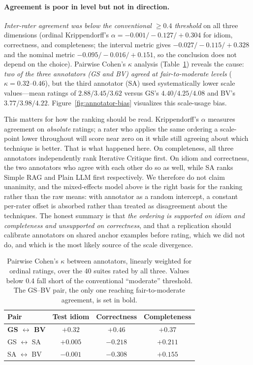 \documentclass[smallextended]{svjour3}
\begin{document}
\paragraph{Agreement is poor in level but not in direction.}
\emph{Inter-rater agreement was below the conventional $\geq 0.4$
threshold} on all three dimensions (ordinal Krippendorff's
$\alpha = -0.001 / -0.127 / +0.304$ for idiom, correctness, and
completeness; the interval metric gives $-0.027 / -0.115 / +0.328$
and the nominal metric $-0.095 / -0.016 / +0.151$, so the conclusion
does not depend on the choice). Pairwise Cohen's $\kappa$ analysis
(Table~\ref{tab:humaneval-kappa}) reveals the cause: \emph{two of
the three annotators (GS and BV) agreed at fair-to-moderate levels}
($\kappa = 0.32$--$0.46$), but the third annotator (SA) used
systematically lower scale values—mean ratings of
$2.88 / 3.45 / 3.62$ versus GS's $4.40 / 4.25 / 4.08$ and BV's
$3.77 / 3.98 / 4.22$. Figure~\ref{fig:annotator-bias} visualizes
this scale-usage bias.

This matters for how the ranking should be read. Krippendorff's
$\alpha$ measures agreement on \emph{absolute} ratings; a rater who
applies the same ordering a scale-point lower throughout will score
near zero on it while still agreeing about which technique is better.
That is what happened here. On completeness, all three annotators
independently rank Iterative Critique first. On idiom and
correctness, the two annotators who agree with each other do so as
well, while SA ranks Simple RAG and Plain LLM first respectively. We
therefore do not claim unanimity, and the mixed-effects model above
is the right basis for the ranking rather than the raw means: with
annotator as a random intercept, a constant per-rater offset is
absorbed rather than treated as disagreement about the techniques. The
honest summary is that \emph{the ordering is supported on idiom and
completeness and unsupported on correctness}, and that a replication
should calibrate annotators on shared anchor examples before
rating, which we did not do, and which is the most likely source of
the scale divergence.

\begin{table}[t]
\centering
\caption{Pairwise Cohen's $\kappa$ between annotators, linearly weighted
for ordinal ratings, over the 40 suites rated by all three. Values
below 0.4 fall short of the conventional ``moderate'' threshold. The
GS--BV pair, the only one reaching fair-to-moderate agreement, is set
in bold.}\label{tab:humaneval-kappa}
\begin{tabular}{@{}lccc@{}}
\toprule
Pair & Test idiom & Correctness & Completeness \\
\midrule
\textbf{GS $\leftrightarrow$ BV} & \textbf{$+0.32$} & \textbf{$+0.46$} & \textbf{$+0.37$} \\
GS $\leftrightarrow$ SA & $+0.005$ & $-0.218$ & $+0.211$ \\
SA $\leftrightarrow$ BV & $-0.001$ & $-0.308$ & $+0.155$ \\
\bottomrule
\end{tabular}
\end{table}
\end{document}
